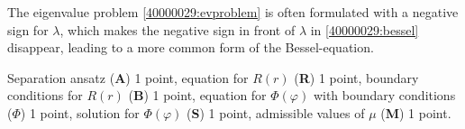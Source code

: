\begin{diskussion}
The eigenvalue problem \eqref{40000029:evproblem} is often formulated with
a negative sign for $\lambda$, which makes the negative sign in front of
$\lambda$ in \eqref{40000029:bessel} disappear, leading to a more common
form of the Bessel-equation.
\end{diskussion}

\begin{bewertung}
Separation ansatz ({\bf A}) 1 point,
equation for $R(r)$ ({\bf R}) 1 point,
boundary conditions for $R(r)$ ({\bf B}) 1 point,
equation for $\Phi(\varphi)$ with boundary conditions ($\Phi$) 1 point,
solution for $\Phi(\varphi)$ ({\bf S}) 1 point,
admissible values of $\mu$ ({\bf M}) 1 point.
\end{bewertung}
